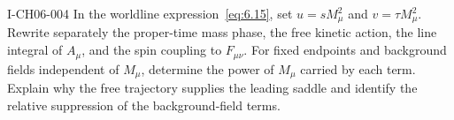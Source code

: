 \begin{exercise}{I-CH06-004}
In the worldline expression~\eqref{eq:6.15}, set
\(u=sM_\mu^2\) and \(v=\tau M_\mu^2\).  Rewrite separately the proper-time
mass phase, the free kinetic action, the line integral of \(A_\mu\), and
the spin coupling to \(F_{\mu\nu}\).  For fixed endpoints and background
fields independent of \(M_\mu\), determine the power of \(M_\mu\) carried
by each term.  Explain why the free trajectory supplies the leading saddle
and identify the relative suppression of the background-field terms.
\end{exercise}
